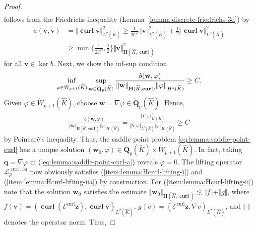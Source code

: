 \documentclass{article}
\begin{document}
\begin{proof}
\begin{align*}
\end{align*}
follows from the Friedrichs inequality (Lemma~\ref{lemma:discrete-friedrichs-3d}) by
\begin{align*}
a(\mathbf{v},\mathbf{v})&=\Vert\operatorname*{\mathbf{curl}}\mathbf{v}\Vert_{L^2(\widehat{K})}^2 \geq \frac{1}{2C^2} \Vert\mathbf{v}\Vert_{L^2(\widehat{K})}^2 + \frac{1}{2}\Vert\operatorname*{\mathbf{curl}}\mathbf{v}\Vert_{L^2(\widehat{K})}^2 \\
&\geq \operatorname*{min}\{\frac{1}{2C^2},\frac{1}{2}\}\Vert\mathbf{v}\Vert_{\mathbf{H}(\widehat{K},\operatorname*{\mathbf{curl}})}^2
\end{align*}
for all $\mathbf{v}\in \operatorname*{ker}b$. Next, we show the inf-sup condition
\begin{align*}
\operatornamewithlimits{inf}_{\varphi\in\mathring{W}_{p+1}(\widehat{K})} \operatornamewithlimits{sup}_{\mathbf{w}\in\mathring{\mathbf{Q}}_p(\widehat{K})} \frac{b(\mathbf{w},\varphi)}{\Vert\mathbf{w}\Vert_{\mathbf{H}(\widehat{K},\operatorname*{\mathbf{curl}})} \Vert\varphi\Vert_{H^1(\widehat{K})}} \geq C.
\end{align*}
Given $\varphi\in\mathring{W}_{p+1}(\widehat{K})$, choose $\mathbf{w}=\nabla\varphi\in\mathring{\mathbf{Q}}_p(\widehat{K})$. Hence,
\begin{align*}
\frac{b(\mathbf{w},\varphi)}{\Vert\mathbf{w}\Vert_{\mathbf{H}(\widehat{K},\operatorname*{\mathbf{curl}})} \Vert\varphi\Vert_{H^1(\widehat{K})}} = \frac{\Vert\nabla\varphi\Vert_{L^2(\widehat{K})}^2}{\Vert\nabla\varphi\Vert_{L^2(\widehat{K})} \Vert\varphi\Vert_{H^1(\widehat{K})}} \geq C
\end{align*}
by Poincar\'e's inequality. Thus, the saddle point problem \eqref{eq:lemma:saddle-point-curl} has a 
unique solution 
$(\mathbf{w}_0,\varphi) \in \mathring{\mathbf{Q}}_p(\widehat{K}) \times \mathring{W}_{p+1}(\widehat K)$. 
In fact, taking ${\mathbf q} = \nabla \varphi$ in (\ref{eq:lemma:saddle-point-curl-a}) reveals 
$\varphi = 0$. 
The lifting operator $\boldsymbol{\mathcal{L}}^{\operatorname*{curl},3d}_p$ now obviously satisfies 
(\ref{item:lemma:Hcurl-lifting-i}) and (\ref{item:lemma:Hcurl-lifting-iia}) by construction. 
For (\ref{item:lemma:Hcurl-lifting-ii}) note that the solution $\mathbf{w}_0$ satisfies the estimate 
$\Vert\mathbf{w}_0\Vert_{\mathbf{H}(\widehat{K},\operatorname*{\mathbf{curl}})} \lesssim \Vert f\Vert + \Vert g\Vert$, 
where $f(\mathbf{v})=(\operatorname*{\mathbf{curl}}(\boldsymbol{\mathcal{E}}^{\operatorname*{curl}}\mathbf{z}),\operatorname*{\mathbf{curl}}\mathbf{v})_{L^2(\widehat{K})}$, $g(v)=(\boldsymbol{\mathcal{E}}^{\operatorname*{curl}}\mathbf{z},\nabla v)_{L^2(\widehat{K})}$, and $\Vert \cdot \Vert$ denotes the operator norm. Thus,

\end{proof}
\end{document}

